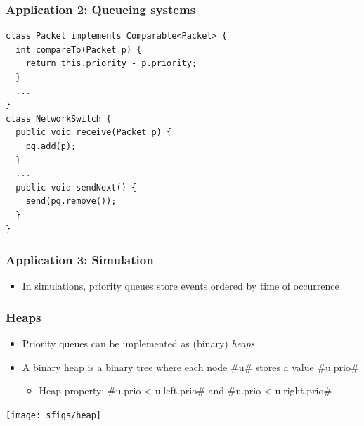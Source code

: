 \documentclass[xcolor=dvipsnames]{beamer}
\begin{document}
\begin{frame}[fragile]
  \frametitle{Application 2: Queueing systems}

\begin{lstlisting}
class Packet implements Comparable<Packet> {
  int compareTo(Packet p) {
    return this.priority - p.priority;
  }
  ...
}
class NetworkSwitch {
  public void receive(Packet p) {
    pq.add(p);
  }
  ...
  public void sendNext() {
    send(pq.remove());
  }
}
\end{lstlisting}
\end{frame}

\begin{frame}
  \frametitle{Application 3: Simulation}
 
  \begin{itemize}
    \item<1->In simulations, priority queues store events ordered by time of occurrence
  \end{itemize}
\end{frame}

\begin{frame}
  \frametitle{Heaps}
  \begin{itemize}
    \item<1-> Priority queues can be implemented as (binary) \emph{heaps}
    \item<2-> A binary heap is a binary tree where each node #u# stores a value #u.prio#
    \begin{itemize}
      \item<3-> Heap property: #u.prio < u.left.prio# and #u.prio < u.right.prio#
    \end{itemize}
  \end{itemize}
  \begin{center}
    \texttt{[image: sfigs/heap]}
  \end{center}
\end{frame} 
\end{document}
